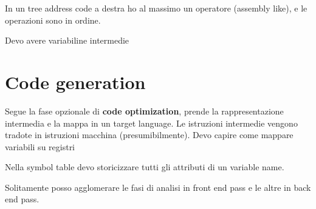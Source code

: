 In un tree address code a destra ho al massimo un operatore (assembly like), e le operazioni sono in ordine.

Devo avere variabiline intermedie
\section{Code generation}
Segue la fase opzionale di \textbf{code optimization}, prende la rappresentazione intermedia e la mappa in un target language.
Le istruzioni intermedie vengono tradote in istruzioni macchina (presumibilmente). Devo capire come mappare variabili su registri

Nella symbol table devo storicizzare tutti gli attributi di un variable name.
 
Solitamente posso agglomerare le fasi di analisi in front end pass e le altre in back end pass.







